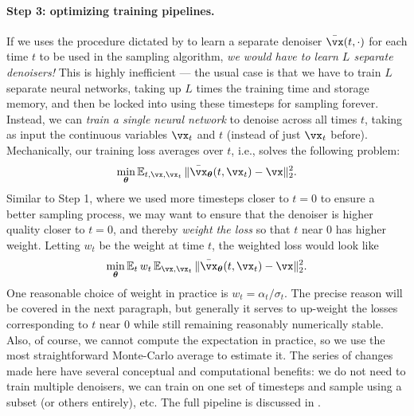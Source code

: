 \documentclass[../../book-main.tex]{subfiles}
\begin{document}
\paragraph{Step 3: optimizing training pipelines.} If we uses the procedure dictated by  to learn a separate denoiser \(\bar{\vx}(t, \cdot)\) for each time \(t\) to be used in the sampling algorithm, \textit{we would have to learn \(L\) separate denoisers!} This is highly inefficient --- the usual case is that we have to train \(L\) separate neural networks, taking up \(L\) times the training time and storage memory, and then be locked into using these timesteps for sampling forever. Instead, we can \textit{train a single neural network} to denoise across all times \(t\), taking as input the continuous variables \(\vx_{t}\) and \(t\) (instead of just \(\vx_{t}\) before). Mechanically, our training loss averages over \(t\), i.e., solves the following problem:
\begin{equation}
	\min_{\bm\theta}\Ex_{t, \vx, \vx_{t}}\norm{\bar{\vx}_{\bm\theta}(t, \vx_{t}) - \vx}_{2}^{2}.
\end{equation}
Similar to Step 1, where we used more timesteps closer to \(t = 0\) to ensure a better sampling process, we may want to ensure that the denoiser is higher quality closer to \(t = 0\), and thereby \textit{weight the loss} so that \(t\) near \(0\) has higher weight. Letting \(w_{t}\) be the weight at time \(t\), the weighted loss would look like
\begin{equation}\label{eq:parametric_denoising_loss}
	\min_{\bm\theta}\Ex_{t}w_{t}\Ex_{\vx, \vx_{t}}\norm{\bar{\vx}_{\bm\theta}(t, \vx_{t}) - \vx}_{2}^{2}.
\end{equation}
One reasonable choice of weight in practice is \(w_{t} = \alpha_{t}/\sigma_{t}\). The precise reason will be covered in the next paragraph, but generally it serves to up-weight the losses corresponding to \(t\) near \(0\) while still remaining reasonably numerically stable. Also, of course, we cannot compute the expectation in practice, so we use the most straightforward Monte-Carlo average to estimate it. The series of changes made here have several conceptual and computational benefits: we do not need to train multiple denoisers, we can train on one set of timesteps and sample using a subset (or others entirely), etc. The full pipeline is discussed in .
\end{document}
